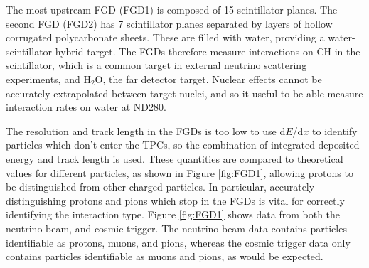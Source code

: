 The most upstream FGD (FGD1) is composed of 15 scintillator planes. The second FGD (FGD2) has 7 scintillator planes separated by layers of hollow corrugated polycarbonate sheets. These are filled with water, providing a water-scintillator hybrid target. The FGDs therefore measure interactions on CH in the scintillator, which is a common target in external neutrino scattering experiments, and H$_2$O, the far detector target. Nuclear effects cannot be accurately extrapolated between target nuclei, and so it useful to be able measure interaction rates on water at ND280.

The resolution and track length in the FGDs is too low to use d$E$/d$x$ to identify particles which don't enter the TPCs, so the combination of integrated deposited energy and track length is used. These quantities are compared to theoretical values for different particles, as shown in Figure \ref{fig:FGD1}, allowing protons to be distinguished from other charged particles. In particular, accurately distinguishing protons and pions which stop in the FGDs is vital for correctly identifying the interaction type. Figure \ref{fig:FGD1} shows data from both the neutrino beam, and cosmic trigger. The neutrino beam data contains particles identifiable as protons, muons, and pions, whereas the cosmic trigger data only contains particles identifiable as muons and pions, as would be expected.

